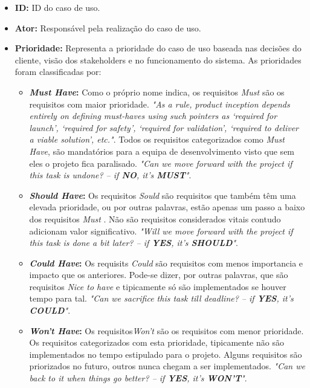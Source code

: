 \begin{itemize}
	\item \textbf{ID:} ID do caso de uso.
	\item \textbf{Ator:} Responsável pela realização do caso de uso.
	\item \textbf{Prioridade:} Representa a prioridade do caso de uso baseada nas decisões do cliente, visão dos stakeholders e no funcionamento do sistema. As prioridades foram classificadas por:
	\begin{itemize}
		\item \textbf{\textit{Must Have}:} Como o próprio nome indica, os requisitos \textit{Must} são os requisitos com maior prioridade. \textit{"As a rule, product inception depends entirely on defining must-haves using such pointers as ‘required for launch’, ‘required for safety’, ‘required for validation’, ‘required to deliver a viable solution’, etc."}\cite{moscow}. Todos os requisitos categorizados como \textit{Must Have}, são mandatórios para a equipa de desenvolvimento visto que sem eles o projeto fica paralisado.\textit{ "Can we move forward with the project if this task is undone? – if \textbf{NO}, it’s \textbf{MUST}"}\cite{moscow}.
		\item \textbf{\textit{Should Have}:} Os requisitos \textit{Sould} são requisitos que também têm uma elevada prioridade, ou por outras palavras, estão apenas um passo a baixo dos requisitos \textit{Must} .
		Não são requisitos considerados vitais contudo adicionam valor significativo.\textit{ "Will we move forward with the project if this task is done a bit later? – if \textbf{YES}, it’s \textbf{SHOULD}"}\cite{moscow}.
		\item \textbf{\textit{Could Have}:} Os requisits \textit{Could} são requisitos com menos importancia e impacto que os anteriores. Pode-se dizer, por outras palavras, que são requisitos \textit{Nice to have} e tipicamente só são implementados se houver tempo para tal. \textit{ "Can we sacrifice this task till deadline? – if \textbf{YES}, it’s \textbf{COULD}"}\cite{moscow}.
		\item \textbf{\textit{Won't Have}:} Os requisitos\textit{Won't} são os requisitos com menor prioridade. Os requisitos categorizados com esta prioridade, tipicamente não são implementados no tempo estipulado para o projeto. Alguns requisitos são priorizados no futuro, outros nunca chegam a ser implementados. \textit{ "Can we back to it when things go better? – if \textbf{YES}, it’s \textbf{WON’T}"}\cite{moscow}.
	\end{itemize}

\end{itemize}
